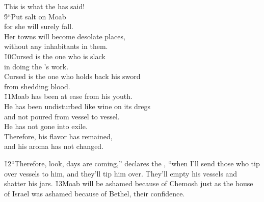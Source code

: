 \begin{poetry}
\poemll    This is what the  has said! \\
\poeml \v{9}``Put salt on Moab \\
\poemll    for she will surely fall. \\
\poeml Her towns will become desolate places, \\
\poemll    without any inhabitants in them. \\
\poeml \v{10}Cursed is the one who is slack \\
\poemll    in doing the 's work. \\
\poeml Cursed is the one who holds back his sword \\
\poemll    from shedding blood. \\
\poeml \v{11}Moab has been at ease from his youth. \\
\poemll    He has been undisturbed like wine on its dregs \\
\poemlll       and not poured from vessel to vessel. \\
\poeml He has not gone into exile. \\
\poemll    Therefore, his flavor has remained, \\
\poemlll       and his aroma has not changed.
\end{poetry}

\v{12}``Therefore, look, days are coming,'' declares the , ``when I'll send those who tip over vessels to him, and they'll tip him over. They'll empty his vessels and shatter his jars. \v{13}Moab will be ashamed because of Chemosh just as the house of Israel was ashamed because of Bethel, their confidence.


